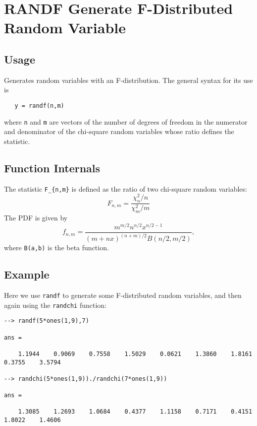 \section{RANDF Generate F-Distributed Random Variable}

\subsection{Usage}

Generates random variables with an F-distribution.  The general
syntax for its use is
\begin{verbatim}
   y = randf(n,m)
\end{verbatim}
where \verb|n| and \verb|m| are vectors of the number of degrees of freedom
in the numerator and denominator of the chi-square random variables
whose ratio defines the statistic.
\subsection{Function Internals}

The statistic \verb|F_{n,m}| is defined as the ratio of two chi-square
random variables:
\[
  F_{n,m} = \frac{\chi_n^2/n}{\chi_m^2/m}
\]
The PDF is given by
\[
  f_{n,m} = \frac{m^{m/2}n^{n/2}x^{n/2-1}}{(m+nx)^{(n+m)/2}B(n/2,m/2)},
\]
where \verb|B(a,b)| is the beta function.
\subsection{Example}

Here we use \verb|randf| to generate some F-distributed random variables,
and then again using the \verb|randchi| function:
\begin{verbatim}
--> randf(5*ones(1,9),7)

ans = 

    1.1944    0.9069    0.7558    1.5029    0.0621    1.3860    1.8161    0.3755    3.5794 

--> randchi(5*ones(1,9))./randchi(7*ones(1,9))

ans = 

    1.3085    1.2693    1.0684    0.4377    1.1158    0.7171    0.4151    1.8022    1.4606 
\end{verbatim}
